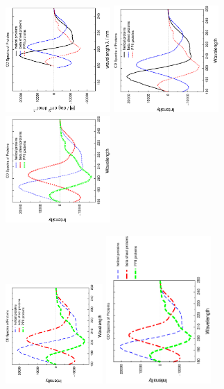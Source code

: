 \documentclass[12pt, a4paper]{article}
\begin{document}
\begin{figure}[h!]
\centering
\includegraphics[width=4cm, angle=-90]{plot01.ps}\hspace{-2em}
\includegraphics[width=4cm, angle=-90]{plot02.ps}\hspace{-2em}
\includegraphics[width=4cm, angle=-90]{plot03.ps}

\includegraphics[width=3.7cm, angle=-90]{plot04.ps}
\includegraphics[width=4cm, angle=-90]{plot05.ps}
\label{Fig:Plots}
\end{figure}
\end{document}
